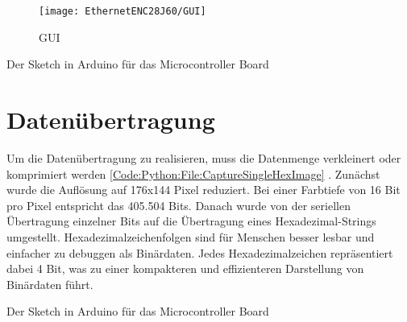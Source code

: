 \begin{figure}
    \centering
    \texttt{[image: EthernetENC28J60/GUI]}
    \caption{GUI}
    \label{fig:GUI}
\end{figure}

\begin{code}
    
    \caption[Sketch ]{Der Sketch  in Arduino für das Microcontroller Board}
    \label{Code:Python:File:TestENC}   
\end{code}

\section{Datenübertragung} 

Um die Datenübertragung zu realisieren, muss die Datenmenge
verkleinert oder komprimiert werden \ref{Code:Python:File:CaptureSingleHexImage} . Zunächst wurde die Auflösung
auf 176x144 Pixel reduziert. Bei einer Farbtiefe von 16 Bit pro Pixel
entspricht das 405.504 Bits. Danach wurde von der seriellen Übertragung einzelner Bits auf die Übertragung eines
Hexadezimal-Strings umgestellt. Hexadezimalzeichenfolgen sind für Menschen besser lesbar und einfacher zu debuggen als Binärdaten. Jedes
Hexadezimalzeichen repräsentiert dabei 4 Bit, was zu einer kompakteren
und effizienteren Darstellung von Binärdaten führt.

\begin{code}
    
    \caption[Sketch ]{Der Sketch  in Arduino für das Microcontroller Board}
    \label{Code:Python:File:CaptureSingleHexImage}   
\end{code}